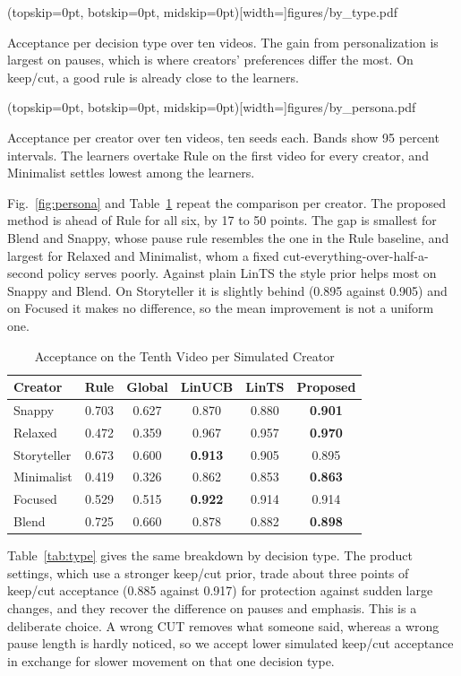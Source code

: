 \documentclass{ieeeaccess}
\begin{document}
\Figure[t!](topskip=0pt, botskip=0pt, midskip=0pt)[width=\textwidth]{figures/by_type.pdf}
{\parbox[t]{0.91\textwidth}{\raggedright Acceptance per decision type over ten videos. The gain from personalization is largest on pauses, which is where creators' preferences differ the most. On keep/cut, a good rule is already close to the learners.}\label{fig:bytype}}

\Figure[t!](topskip=0pt, botskip=0pt, midskip=0pt)[width=\textwidth]{figures/by_persona.pdf}
{\parbox[t]{0.91\textwidth}{\raggedright Acceptance per creator over ten videos, ten seeds each. Bands show 95 percent intervals. The learners overtake Rule on the first video for every creator, and Minimalist settles lowest among the learners.}\label{fig:persona}}

Fig.~\ref{fig:persona} and Table~\ref{tab:persona} repeat the comparison per creator. The proposed method is ahead of Rule for all six, by 17 to 50 points. The gap is smallest for Blend and Snappy, whose pause rule resembles the one in the Rule baseline, and largest for Relaxed and Minimalist, whom a fixed cut-everything-over-half-a-second policy serves poorly. Against plain LinTS the style prior helps most on Snappy and Blend. On Storyteller it is slightly behind (0.895 against 0.905) and on Focused it makes no difference, so the mean improvement is not a uniform one.

\begin{table}[t]
\caption{Acceptance on the Tenth Video per Simulated Creator}
\label{tab:persona}
\setlength{\tabcolsep}{3pt}
\centering
\begin{tabular}{|l|c|c|c|c|c|}
\hline
Creator & Rule & Global & LinUCB & LinTS & Proposed \\
\hline
Snappy & 0.703 & 0.627 & 0.870 & 0.880 & \textbf{0.901} \\
Relaxed & 0.472 & 0.359 & 0.967 & 0.957 & \textbf{0.970} \\
Storyteller & 0.673 & 0.600 & \textbf{0.913} & 0.905 & 0.895 \\
Minimalist & 0.419 & 0.326 & 0.862 & 0.853 & \textbf{0.863} \\
Focused & 0.529 & 0.515 & \textbf{0.922} & 0.914 & 0.914 \\
Blend & 0.725 & 0.660 & 0.878 & 0.882 & \textbf{0.898} \\
\hline
\end{tabular}
\end{table}

Table~\ref{tab:type} gives the same breakdown by decision type. The product settings, which use a stronger keep/cut prior, trade about three points of keep/cut acceptance (0.885 against 0.917) for protection against sudden large changes, and they recover the difference on pauses and emphasis. This is a deliberate choice. A wrong CUT removes what someone said, whereas a wrong pause length is hardly noticed, so we accept lower simulated keep/cut acceptance in exchange for slower movement on that one decision type.
\end{document}
